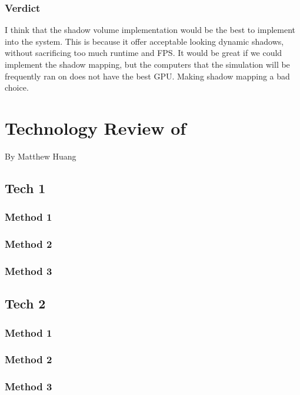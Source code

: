 \documentclass[10pt,journal,compsoc,draftclsnofoot]{IEEEtran}
\begin{document}
\subsubsection{Verdict}
I think that the shadow volume implementation would be the best to implement into the system.
This is because it offer acceptable looking dynamic shadows, without sacrificing too much runtime and FPS.
It would be great if we could implement the shadow mapping, but the computers that the simulation will be frequently ran on does not have the best GPU.
Making shadow mapping a bad choice.

\newpage

\section{Technology Review of}
\large{By Matthew Huang}

\subsection{Tech 1}

\subsubsection{Method 1}

\subsubsection{Method 2}

\subsubsection{Method 3}

\subsection{Tech 2}

\subsubsection{Method 1}

\subsubsection{Method 2}

\subsubsection{Method 3}
\end{document}
